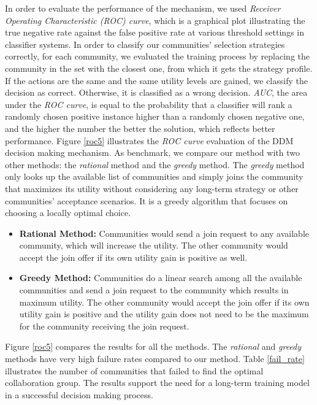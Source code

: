 {In order to evaluate the performance of the mechanism, we used \emph{Receiver Operating Characteristic (ROC) curve}, which is a graphical plot illustrating the true negative rate against the false positive rate at various threshold settings in classifier systems. In order to classify our communities' selection strategies correctly, for each community, we evaluated the training process by replacing the community in the set with the closest one, from which it gets the strategy profile. If the actions are the same and the same utility levels are gained, we classify the decision as correct. Otherwise, it is classified as a wrong decision. \emph{AUC}, the area under the \emph{ROC curve}, is equal to the probability that a classifier will rank a randomly chosen positive instance higher than a randomly chosen negative one, and the higher the number the better the solution, which reflects better performance.  Figure \ref{roc5} illustrates the \emph{ROC curve} evaluation of the DDM decision making mechanism. As benchmark, we compare our method with two other methods: the \emph{rational} method and the \emph{greedy} method. The \emph{greedy} method only looks up the available list of communities and simply joins the community that maximizes its utility without considering any long-term strategy or other communities' acceptance scenarios. It is a greedy algorithm that focuses on choosing a locally optimal choice.

\begin{itemize}
  \item {\bf Rational Method:} Communities would send a join request to any available community, which will increase the utility. The other community would accept the join offer if its own utility gain is positive as well.
	\item {\bf Greedy Method:} Communities do a linear search among all the available communities and send a join request to the community which results in maximum utility. The other community would accept the join offer if its own utility gain is positive and the utility gain does not need to be the maximum for the community receiving the join request.
\end{itemize}

Figure \ref{roc5} compares the results for all the methods. The \emph{rational} and \emph{greedy} methods have very high failure rates compared to our method. Table \ref{fail_rate} illustrates the number of communities that failed to find the optimal collaboration group. The results support the need for a long-term training model in a successful decision making process.

}
